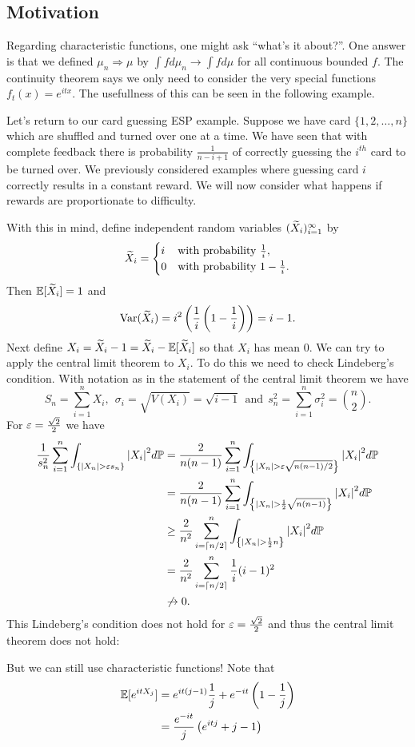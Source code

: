 \subsection{Motivation}
Regarding characteristic functions, one might ask ``what's it about?''. One answer is that we defined $\mu_n \Rightarrow \mu$ by $\int f d\mu_n \to \int f d\mu$ for all continuous bounded $f$. The continuity theorem says we only need to consider the very special functions $f_t(x) = e^{itx}$. The usefullness of this can be seen in the following example.
\begin{ex}
    Let's return to our card guessing ESP example. Suppose we have card $\{1,2,\ldots, n\}$ which are shuffled and turned over one at a time. We have seen that with complete feedback there is probability $\frac{1}{n-i+1}$ of correctly guessing the $i^{th}$ card to be turned over. We previously considered examples where guessing card $i$ correctly results in a constant reward. We will now consider what happens if rewards are proportionate to difficulty. 

    With this in mind, define independent random variables $(\widetilde{X}_i)_{i=1}^\infty$ by
    \[\widetilde{X}_i = \begin{cases}
        i & \text{with probability } \frac{1}{i},\\
        0 & \text{with probability } 1-\frac{1}{i}.
    \end{cases} \]
    Then ${\mathbb{E}}[\widetilde{X}_i]=1$ and 
    \[\operatorname{Var}(\widetilde{X}_i) = i^2\left(\frac{1}{i}\left(1-\frac{1}{i}\right)\right) = i-1. \]
    Next define $X_i = \widetilde{X}_i-1=\widetilde{X}_i-{\mathbb{E}}[\widetilde{X}_i]$ so that $X_i$ has mean 0. We can try to apply the central limit theorem to $X_i$. To do this we need to check Lindeberg's condition. With notation as in the statement of the central limit theorem we have
    \[S_n = \sum_{i=1}^n X_i, ~~\sigma_i = \sqrt{V(X_i)} = \sqrt{i-1}~~ \text{and}~~s_n^2 = \sum_{i=1}^n \sigma_i^2 = \binom{n}{2}.\]
    For $\varepsilon = \frac{\sqrt{2}}{2}$ we have 
    \begin{align*}
        \frac{1}{s_n^2}\sum_{i=1}^n \int_{\{{\left\lvert X_n\right\rvert} > \varepsilon s_n\}}{\left\lvert X_i\right\rvert}^2 d{\mathbb{P}} &=\frac{2}{n(n-1)}\sum_{i=1}^n \int_{\left\{{\left\lvert X_n\right\rvert} > \varepsilon\sqrt{n(n-1)/2}\right\}}{\left\lvert X_i\right\rvert}^2 d{\mathbb{P}}\\
        &= \frac{2}{n(n-1)}\sum_{i=1}^n \int_{\left\{{\left\lvert X_n\right\rvert} > \frac{1}{2}\sqrt{n(n-1)}\right\}}{\left\lvert X_i\right\rvert}^2 d{\mathbb{P}}\\
        &\ge \frac{2}{n^2}\sum_{i = \lceil n/2 \rceil}^n \int_{\left\{{\left\lvert X_n\right\rvert} > \frac{1}{2}n\right\}}{\left\lvert X_i\right\rvert}^2 d{\mathbb{P}}\\
        &=\frac{2}{n^2} \sum_{i = \lceil n/2 \rceil}^n \frac{1}{i}(i-1)^2\\
        &\not\to  0.
    \end{align*}
    This Lindeberg's condition does not hold for $\varepsilon = \frac{\sqrt{2}}{2}$ and thus the central limit theorem does not hold:
    
    \grumpy

    But we can still use characteristic functions! Note that
    \begin{align*}
        {\mathbb{E}}[e^{i t X_j}] &= e^{it(j-1)}\frac{1}{j}+e^{-it}\left(1-\frac{1}{j}\right)\\
        &= \frac{e^{-it}}{j}\left(e^{itj}+j-1\right)
    \end{align*}
\end{ex}
